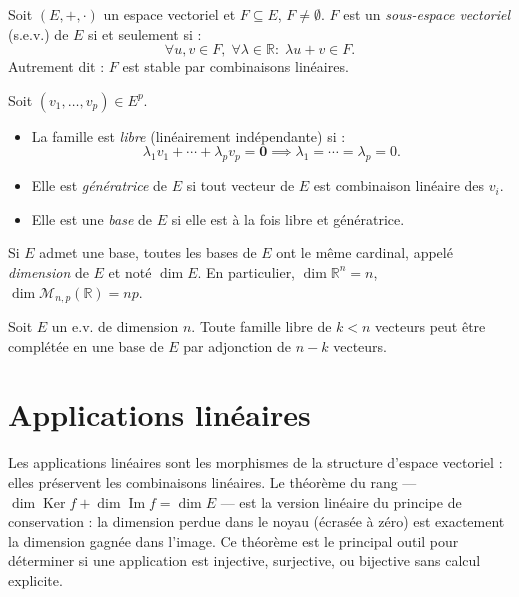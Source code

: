 \documentclass[11pt,a4paper,twoside]{book}
\newcommand{\R}{\mathbb{R}}
\DeclareMathOperator{\Im}{Im}
\DeclareMathOperator{\Ker}{Ker}
\begin{document}
\begin{definitionbox}
Soit $(E,+,\cdot)$ un espace vectoriel et $F \subseteq E$, $F \neq \emptyset$.
$F$ est un \emph{sous-espace vectoriel} (s.e.v.) de $E$ si et seulement si :
\[
  \forall u,v \in F,\;\forall \lambda \in \R :\; \lambda u + v \in F.
\]
Autrement dit : $F$ est stable par combinaisons linéaires.
\end{definitionbox}

\begin{definitionbox}
Soit $(v_1,\ldots,v_p) \in E^p$.
\begin{itemize}
  \item La famille est \emph{libre} (linéairement indépendante) si :
    \[\lambda_1 v_1 + \cdots + \lambda_p v_p = \mathbf{0} \implies \lambda_1 = \cdots = \lambda_p = 0.\]
  \item Elle est \emph{génératrice} de $E$ si tout vecteur de $E$ est combinaison linéaire des $v_i$.
  \item Elle est une \emph{base} de $E$ si elle est à la fois libre et génératrice.
\end{itemize}
\end{definitionbox}

\begin{theoremebox}
Si $E$ admet une base, toutes les bases de $E$ ont le même cardinal, appelé
\emph{dimension} de $E$ et noté $\dim E$.
En particulier, $\dim \R^n = n$, $\dim \mathcal{M}_{n,p}(\R) = np$.
\end{theoremebox}

\begin{theoremebox}
Soit $E$ un e.v. de dimension $n$. Toute famille libre de $k < n$ vecteurs peut être
complétée en une base de $E$ par adjonction de $n-k$ vecteurs.
\end{theoremebox}

\section{Applications linéaires}

Les applications linéaires sont les morphismes de la structure d'espace vectoriel : elles préservent les combinaisons linéaires. Le théorème du rang — $\dim \Ker f + \dim \Im f = \dim E$ — est la version linéaire du principe de conservation : la dimension perdue dans le noyau (écrasée à zéro) est exactement la dimension gagnée dans l'image. Ce théorème est le principal outil pour déterminer si une application est injective, surjective, ou bijective sans calcul explicite.
\end{document}
